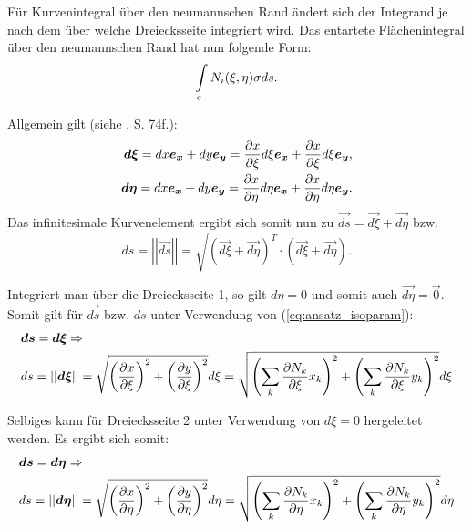 Für Kurvenintegral über den neumannschen Rand ändert sich der Integrand je nach dem über welche Dreiecksseite integriert wird. 
Das entartete Flächenintegral über den neumannschen Rand hat nun folgende Form:
\begin{equation}
	\int\displaylimits_{c}N_i(\xi, \eta)\sigma ds.
\end{equation}

Allgemein gilt (siehe \cite{SMS_VO_skript}, S. 74f.):
\begin{align}
\label{eq:subs}
\boldsymbol{d\xi} = dx\boldsymbol{e_x} + dy\boldsymbol{e_y} = \frac{\partial x}{\partial \xi}d\xi \boldsymbol{e_x} + \frac{\partial x}{\partial \xi} d\xi \boldsymbol{e_y},\\
\boldsymbol{d\eta} = dx\boldsymbol{e_x} + dy\boldsymbol{e_y} = \frac{\partial x}{\partial \eta}d\eta \boldsymbol{e_x} + \frac{\partial x}{\partial \eta} d\eta \boldsymbol{e_y} .\nonumber
\end{align}
Das infinitesimale Kurvenelement ergibt sich somit nun zu $\vec{ds} = \vec{d\xi} + \vec{d\eta}$ bzw. \begin{equation}
\label{eq:ds_abs}
ds = \left|\left| \vec{ds} \right|\right| = \sqrt{\left(\vec{d\xi} + \vec{d\eta}\right)^T\cdot \left( \vec{d\xi} + \vec{d\eta} \right)}.
\end{equation}\newline

Integriert man über die Dreiecksseite 1, so gilt $d\eta = 0$ und somit auch $\vec{d\eta} = \vec{0}$.
Somit gilt für $\vec{ds}$ bzw. $ds$ unter Verwendung von (\ref{eq:ansatz_isoparam}):
\begin{align}
	&\boldsymbol{ds} =  \boldsymbol{d\xi} \Rightarrow \nonumber \\
	&ds = \left|\left| \boldsymbol{d\xi} \right|\right| = \sqrt{ \left(\frac{\partial x}{\partial \xi}\right)^2 + \left(\frac{\partial y}{\partial \xi}\right)^2} d\xi = \sqrt{ \left( \sum\limits_{k}\frac{\partial N_k}{\partial \xi}x_k \right)^2  + \left( \sum\limits_{k}\frac{\partial N_k}{\partial \xi}y_k \right)^2 } d\xi
\end{align}

Selbiges kann für Dreiecksseite 2 unter Verwendung von $d\xi = 0$ hergeleitet werden. Es ergibt sich somit:
\begin{align}
&\boldsymbol{ds} =  \boldsymbol{d\eta} \Rightarrow \nonumber \\
&ds = \left|\left| \boldsymbol{d\eta} \right|\right| = \sqrt{ \left(\frac{\partial x}{\partial \eta}\right)^2 + \left(\frac{\partial y}{\partial \eta}\right)^2} d\eta = \sqrt{ \left( \sum\limits_{k}\frac{\partial N_k}{\partial \eta}x_k \right)^2  + \left( \sum\limits_{k}\frac{\partial N_k}{\partial \eta}y_k \right)^2 } d\eta
\end{align}


